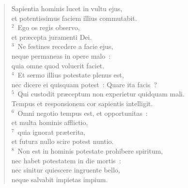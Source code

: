 \begin{flushleft}\begin{verse}\vspace{-19pt}Sapientia hominis lucet in vultu ejus,\\ et potentissimus faciem illius commutabit.\\
${}^{2}$~Ego os regis observo,\\ et pr\ae cepta juramenti Dei.\\
${}^{3}$~Ne festines recedere a facie ejus,\\ neque permaneas in opere malo~:\\ quia omne quod voluerit faciet.\\
${}^{4}$~Et sermo illius potestate plenus est,\\ nec dicere ei quisquam potest~: Quare ita facis~?\\
${}^{5}$~Qui custodit pr\ae ceptum non experietur quidquam mali.\\ Tempus et responsionem cor sapientis intelligit.\\
${}^{6}$~Omni negotio tempus est, et opportunitas~:\\ et multa hominis afflictio,\\
${}^{7}$~quia ignorat pr\ae terita,\\ et futura nullo scire potest nuntio.\\
${}^{8}$~Non est in hominis potestate prohibere spiritum,\\ nec habet potestatem in die mortis~:\\ nec sinitur quiescere ingruente bello,\\ neque salvabit impietas impium.\end{verse}\end{flushleft}


